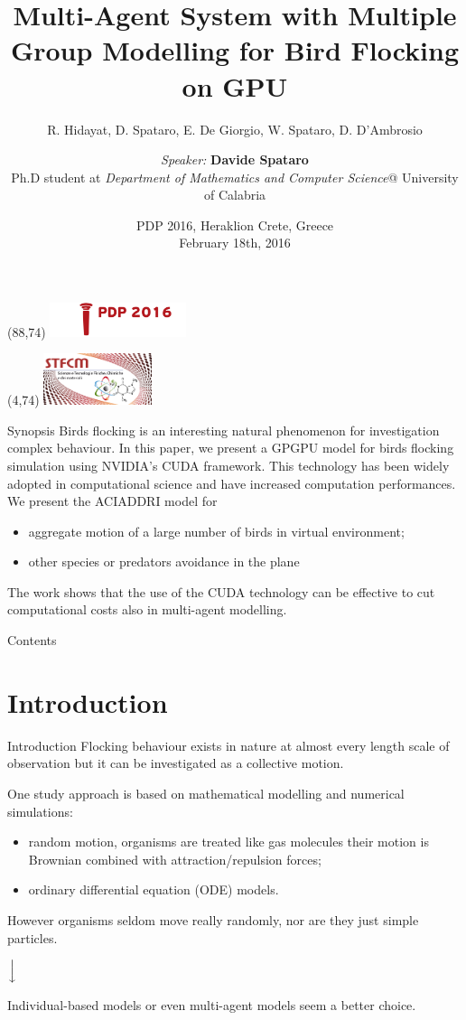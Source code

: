 \documentclass{beamer}
\title[The ACIADDRI model]{Multi-Agent System with Multiple Group Modelling
for Bird Flocking on GPU}
\subtitle{ R. Hidayat, D. Spataro, E. De Giorgio, W. Spataro, D. D'Ambrosio  }
\author[R. Hidayat, D. Spataro, E. De Giorgio, W. Spataro, D. D'Ambrosio] 
{\textit{Speaker:} \hfill  \textbf{ Davide Spataro} \\
Ph.D student at \textit{Department of Mathematics and Computer Science}@
   University of Calabria
}
\date{PDP 2016,  Heraklion Crete, Greece \\
February 18th, 2016}
\newcommand{\MyLogo}{%
\begin{textblock}{13}(88,74)
 \includegraphics[height=1cm, angle=0]{images/pdp2016}
\end{textblock}
}
\newcommand{\MyLogoo}{%
\begin{textblock}{15}(4,74)
 \includegraphics[height=1.5cm, angle=0]{images/logo1}
\end{textblock}
}
\begin{document}
\begin{frame}
\MyLogo
\MyLogoo
\titlepage
\end{frame}

\begin{frame}{Synopsis}
Birds flocking is an interesting natural phenomenon for investigation complex behaviour. In this paper, we present a GPGPU model for birds flocking simulation using NVIDIA's CUDA framework. This technology has been widely adopted
in computational science and have increased computation performances. We present the ACIADDRI model for 
\begin{itemize}
\item aggregate motion of a large
number of birds in virtual environment;
\item other species or predators avoidance in the plane
\end{itemize} 

The work shows that the use of the CUDA technology can be effective to cut computational costs also in multi-agent modelling.
\end{frame}

\begin{frame}{Contents}
\tableofcontents
\end{frame}

\section{Introduction}
\begin{frame}{Introduction}
 Flocking behaviour exists in nature at almost every length scale of observation but it can be investigated as a collective motion. 

One study approach is based on mathematical modelling and numerical simulations:
\begin{itemize}
\item random motion, organisms are treated like gas molecules their motion is Brownian combined with attraction/repulsion forces;
\item ordinary differential equation (ODE) models.
\end{itemize}
However organisms seldom move really randomly, nor are they just
simple particles. 
\begin{center}
$\Big{\downarrow}$ 
\end{center}

Individual-based models or even multi-agent models seem a
better choice.  
\end{frame}
\end{document}
